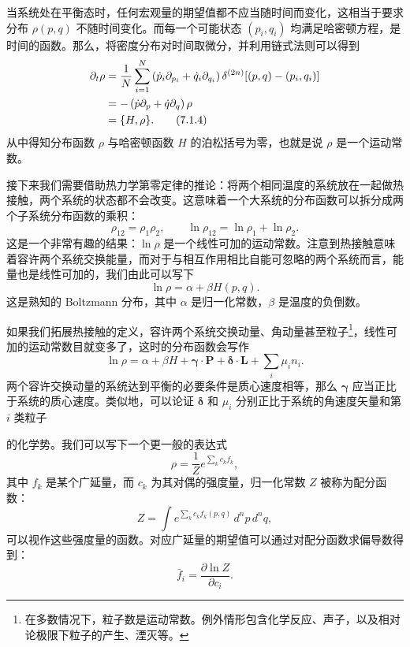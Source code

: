 当系统处在平衡态时，任何宏观量的期望值都不应当随时间而变化，这相当于要求分布 $\rho(p,q)$ 不随时间变化。而每一个可能状态 $(p_i,q_i)$ 均满足哈密顿方程，是时间的函数。那么，将密度分布对时间取微分，并利用链式法则可以得到
\begin{align}
 \partial_t\rho
 &=\frac1N\sum_{i=1}^{N}
 \left(\dot p_i\partial_{p_i}+\dot q_i\partial_{q_i}\right)
 \delta^{(2n)}\!\left[(p,q)-(p_i,q_i)\right]\notag\\
 &=-\left(\dot p\partial_p+\dot q\partial_q\right)\rho\notag\\
 &=\{H,\rho\}.
\tag{7.1.4}
\end{align}
从中得知分布函数 $\rho$ 与哈密顿函数 $H$ 的泊松括号为零，也就是说 $\rho$ 是一个运动常数。

接下来我们需要借助热力学第零定律的推论：将两个相同温度的系统放在一起做热接触，两个系统的状态都不会改变。这意味着一个大系统的分布函数可以拆分成两个子系统分布函数的乘积：
\begin{equation}
 \rho_{12}=\rho_1\rho_2,
 \qquad
 \ln\rho_{12}=\ln\rho_1+\ln\rho_2.
\tag{7.1.5}
\end{equation}
这是一个非常有趣的结果：$\ln\rho$ 是一个线性可加的运动常数。注意到热接触意味着容许两个系统交换能量，而对于与相互作用相比自能可忽略的两个系统而言，能量也是线性可加的，我们由此可以写下
\begin{equation}
 \ln\rho=\alpha+\beta H(p,q).
\tag{7.1.6}
\end{equation}
这是熟知的 Boltzmann 分布，其中 $\alpha$ 是归一化常数，$\beta$ 是温度的负倒数。

如果我们拓展热接触的定义，容许两个系统交换动量、角动量甚至粒子\footnote{在多数情况下，粒子数是运动常数。例外情形包含化学反应、声子，以及相对论极限下粒子的产生、湮灭等。}，线性可加的运动常数目就变多了，这时的分布函数会写作
\begin{equation}
 \ln\rho=\alpha+\beta H+\bm\gamma\cdot\bm P+\bm\delta\cdot\bm L+\sum_i\mu_i n_i.
\tag{7.1.7}
\end{equation}
两个容许交换动量的系统达到平衡的必要条件是质心速度相等，那么 $\bm\gamma$ 应当正比于系统的质心速度。类似地，可以论证 $\bm\delta$ 和 $\mu_i$ 分别正比于系统的角速度矢量和第 $i$ 类粒子

的化学势。我们可以写下一个更一般的表达式
\begin{equation}
 \rho=\frac1Z e^{\sum_k c_k f_k},
\tag{7.1.8}
\end{equation}
其中 $f_k$ 是某个广延量，而 $c_k$ 为其对偶的强度量，归一化常数 $Z$ 被称为配分函数：
\begin{equation}
 Z=\int e^{\sum_k c_k f_k(p,q)}\,d^np\,d^nq,
\tag{7.1.9}
\end{equation}
可以视作这些强度量的函数。对应广延量的期望值可以通过对配分函数求偏导数得到：
\begin{equation}
 \bar f_i=\frac{\partial\ln Z}{\partial c_i}.
\tag{7.1.10}
\end{equation}

